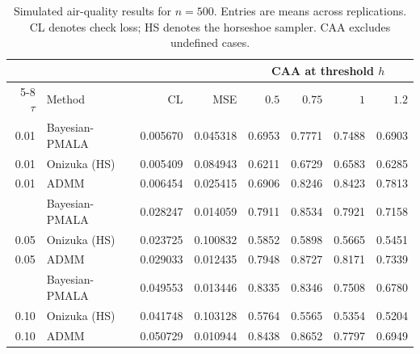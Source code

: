 \begin{table}[H]
\centering
\small
\setlength{\tabcolsep}{4pt}
\caption{Simulated air-quality results for $n=500$. Entries are means across replications. CL denotes check loss; HS denotes the horseshoe sampler. CAA excludes undefined cases.}
\label{tab:air_n500}
\begin{tabular}{@{}rlrrrrrr@{}}
\toprule
 & & & & \multicolumn{4}{c}{CAA at threshold $h$} \\
\cmidrule(lr){5-8}
$\tau$ & Method & CL & MSE & $0.5$ & $0.75$ & $1$ & $1.2$ \\
\midrule
0.01 & Bayesian-PMALA & 0.005670 & 0.045318 & 0.6953 & 0.7771 & 0.7488 & 0.6903 \\
0.01 & Onizuka (HS) & 0.005409 & 0.084943 & 0.6211 & 0.6729 & 0.6583 & 0.6285 \\
0.01 & ADMM & 0.006454 & 0.025415 & 0.6906 & 0.8246 & 0.8423 & 0.7813 \\
\addlinespace[3pt]
0.05 & Bayesian-PMALA & 0.028247 & 0.014059 & 0.7911 & 0.8534 & 0.7921 & 0.7158 \\
0.05 & Onizuka (HS) & 0.023725 & 0.100832 & 0.5852 & 0.5898 & 0.5665 & 0.5451 \\
0.05 & ADMM & 0.029033 & 0.012435 & 0.7948 & 0.8727 & 0.8171 & 0.7339 \\
\addlinespace[3pt]
0.10 & Bayesian-PMALA & 0.049553 & 0.013446 & 0.8335 & 0.8346 & 0.7508 & 0.6780 \\
0.10 & Onizuka (HS) & 0.041748 & 0.103128 & 0.5764 & 0.5565 & 0.5354 & 0.5204 \\
0.10 & ADMM & 0.050729 & 0.010944 & 0.8438 & 0.8652 & 0.7797 & 0.6949 \\
\bottomrule
\end{tabular}
\end{table}

